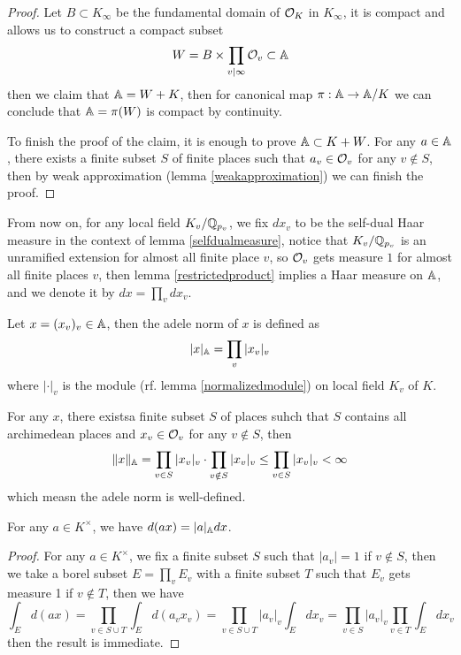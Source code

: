 \begin{proof}
    Let \(B \subset K_{\infty}\) be the fundamental domain of \(\mathcal{O}_K\) in \(K_{\infty}\), it is compact and allows us to construct a compact subset
    \[W = B \times \prod_{v \mid \infty} \mathcal{O}_v \subset \mathbb{A}\]
    then we claim that \(\mathbb{A} = W + K\), then for canonical map \(\pi:\mathbb{A} \to \mathbb{A}/K\) we can conclude that \(\mathbb{A} = \pi(W)\) is compact by continuity.

    To finish the proof of the claim, it is enough to prove \(\mathbb{A} \subset K+W\). For any \(a \in \mathbb{A}\), there exists a finite subset \(S\) of finite places such that \(a_v \in \mathcal{O}_v\) for any \(v \notin S\), then by weak approximation (lemma \ref{weakapproximation}) we can finish the proof.
\end{proof} 


From now on, for any local field \(K_v/\mathbb{Q}_{p_v}\), we fix \(dx_v\) to be the self-dual Haar measure in the context of lemma \ref{selfdualmeasure}, notice that \(K_v/\mathbb{Q}_{p_v}\) is an unramified extension for almost all finite place \(v\), so \(\mathcal{O}_v\) gets measure \(1\) for almost all finite places \(v\), then lemma \ref{restrictedproduct} implies a Haar measure on \(\mathbb{A}\), and we denote it by \(dx = \prod_v dx_v\).

\begin{definition}
    Let \(x = (x_v)_v \in \mathbb{A}\), then the adele norm of \(x\) is defined as
    \[|x|_{\mathbb{A}} = \prod_{v} |x_v|_v\]
    where \(|\cdot|_v\) is the module (rf. lemma \ref{normalizedmodule}) on local field \(K_v\) of \(K\).
 \end{definition}

\begin{remark}
   For any \(x\), there existsa finite subset \(S\) of places suhch that \(S\) contains all archimedean places and \(x_v \in \mathcal{O}_v\) for any \(v \notin S\), then 
   \[\|x\|_{\mathbb{A}} = \prod_{v \in S}|x_v|_v \cdot \prod_{v \notin S} |x_v|_v \leq \prod_{v \in S}|x_v|_v < \infty\]
   which measn the adele norm is well-defined. 
\end{remark}

\begin{lemma}
    For any \(a \in K^\times\), we have \(d(ax) = |a|_{\mathbb{A}}dx\).
\end{lemma}

\begin{proof}
    For any \(a \in K^\times\), we fix a finite subset \(S\) such that \(|a_v| = 1\) if \(v \notin S\), then we take a borel subset \(E = \prod_v E_v\) with a finite subset \(T\) such that \(E_v\) gets measure 1 if \(v \notin T\), then we have
    \[\int_{E}d(ax) = \prod_{v \in S \cup T}\int_{E} d(a_vx_v) = \prod_{v \in S\cup T}|a_v|_v \int_{E} dx_v = \prod_{v \in S }|a_v|_v \prod_{v \in T}\int_E dx_v\]
    then the result is immediate.
\end{proof}

